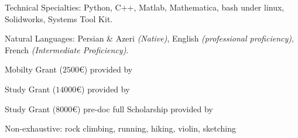 \documentclass[10pt,a4paper]{article} %
\begin{document}
\spacedhrule{0.5em}{-0.4em} %



\inlineheadsection %
{Technical Specialties:}
{Python, C++, Matlab, Mathematica, bash under linux, Solidworks, Systems Tool Kit.}


\inlineheadsection %
{Natural Languages:}
{Persian \& Azeri \textit{(Native)}, English \textit{(professional proficiency)}, French \textit{(Intermediate Proficiency)}.}


\spacedhrule{1.6em}{-0.4em} %



\inlineheadsection
{Mobilty Grant}
{($2500$\euro) provided by }

\inlineheadsection
{Study Grant}
{($14000$\euro) provided by }

\inlineheadsection
{Study Grant}
{($8000$\euro) pre-doc full Scholarship provided by }

\spacedhrule{1.6em}{-0.4em} %


\inlineheadsection %
{Non-exhaustive:}
{rock climbing, running, hiking, violin, sketching}
\end{document}
